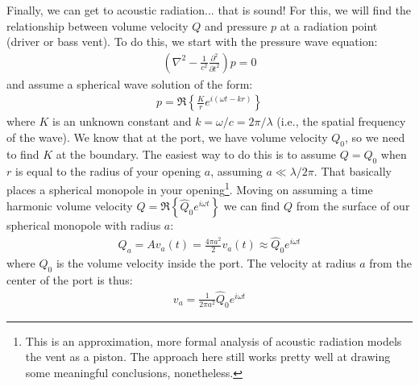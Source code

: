 \documentclass[10pt]{book}
\begin{document}
Finally, we can get to acoustic radiation... that is sound! For this, we will find the relationship between volume velocity $Q$ and pressure $p$ at a radiation point (driver or bass vent). To do this, we start with the pressure wave equation:
\begin{align}
\left(\nabla^2-\frac{1}{c^2}\frac{\partial^2}{\partial t^2}\right)p=0
\end{align}
and assume a spherical wave solution of the form:
\begin{align}
p=\Re \left\{ \frac{K}{r} e^{i(\omega t - k r)} \right\}
\end{align}
where $K$ is an unknown constant and $k=\omega/c=2\pi/\lambda$ (i.e., the spatial frequency of the wave). We know that at the port, we have volume velocity $Q_0$, so we need to find $K$ at the boundary. The easiest way to do this is to assume $Q=Q_0$ when $r$ is equal to the radius of your opening $a$, assuming $a\ll \lambda/2\pi$. That basically places a spherical monopole in your opening\footnote{This is an approximation, more formal analysis of acoustic radiation models the vent as a piston. The approach here still works pretty well at drawing some meaningful conclusions, nonetheless.}. Moving on assuming a time harmonic volume velocity $Q=\Re\left\{\hat{Q}_0e^{i\omega t}\right\}$ we can find $Q$ from the surface of our spherical monopole with radius $a$:
\begin{align}
Q_a=Av_a(t)=\frac{4\pi a^2}{2} v_a(t) \approx \hat{Q}_0e^{i\omega t}
\end{align}
where $Q_0$ is the volume velocity inside the port. The velocity at radius $a$ from the center of the port is thus:
\begin{align}
v_a=\frac{1}{2\pi a^2} \hat{Q}_0 e^{i\omega t}
\end{align}


%
\end{document}
